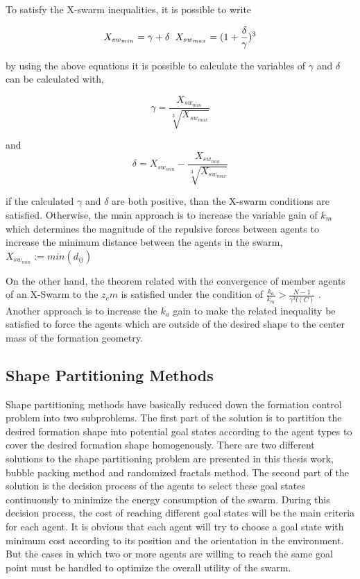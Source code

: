 To satisfy the X-swarm inequalities, it is possible to write 

\begin{equation}
 X_{sw_{min}} = \gamma + \delta  \hspace{0.2cm} X_{sw_{max}} = (1 + \frac{\delta}{\gamma})^3
\end{equation}

by using the above equations it is possible to calculate the variables of $\gamma$ and $\delta$ can be calculated with,

\begin{equation}
\gamma = \frac{ X_{sw_{min}}}{\sqrt[3]{ X_{sw_{max}}}}
\end{equation}
			
and
\begin{equation}
\delta =  X_{sw_{min}} - \frac{ X_{sw_{min}}}{\sqrt[3]{ X_{sw_{max}}}}
\end{equation}

if the calculated  $\gamma$ and $\delta$ are both positive, than the X-swarm conditions are satisfied. Otherwise, the main approach is to increase the variable gain of $k_m$ which determines the magnitude of the repulsive forces between agents to increase the minimum distance between the agents in the swarm, $X_{sw_{min}} := min(d_{ij})$
			
On the other hand, the theorem related with the convergence of member agents of an X-Swarm to the $z_cm$ is satisfied under the condition of $\frac{k_a}{k_m} > \frac{N-1}{\gamma^3  l(C)}$ . Another approach is to increase the $k_a$ gain to make the related inequality be satisfied to force the agents which are outside of the desired shape to the center mass of the formation geometry. 
					
\subsection{Shape Partitioning Methods}
Shape partitioning methods have basically reduced down the formation control problem into two subproblems. The first part of the solution is to partition the desired formation shape into potential goal states according to the agent types to cover the desired formation shape homogenously. There are two different solutions to the shape partitioning problem are presented in this thesis work, bubble packing method and randomized fractals method. The second part of the solution is the decision process of the agents to select these goal states continuously to minimize the energy consumption of the swarm. During this decision process, the cost of reaching different goal states will be the main criteria for each agent. It is obvious that each agent will try to choose a goal state with minimum cost according to its position and the orientation in the environment. But the cases in which two or more agents are willing to reach the same goal point must be handled to optimize the overall utility of the swarm. 

